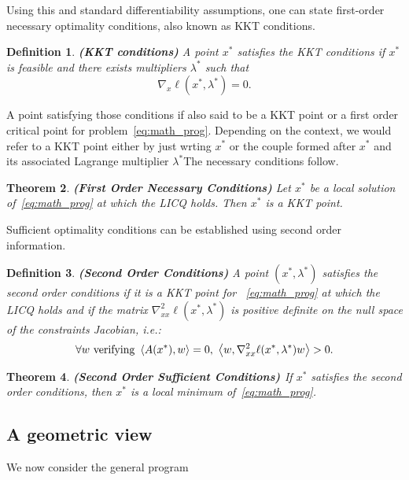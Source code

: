 \documentclass[10pt]{article}
\newtheorem{theorem}{Theorem}[]
\newtheorem{definition}[theorem]{Definition}
\numberwithin{equation}{section}
\begin{document}
	Using this and standard differentiability assumptions, one can state first-order necessary optimality conditions, also known as KKT conditions. 
	
	\begin{definition}\label{def:kkt_point}
		\textbf{(KKT conditions)}
		A point $x^*$ satisfies the KKT conditions if $x^* $ is feasible and there exists multipliers \(\lambda^*\) such that \[\nabla_x \ell (x^*,\lambda^*)=0.\]
	\end{definition}
	
	
	A point satisfying those conditions if also said to be a KKT point or a first order critical point for problem~\eqref{eq:math_prog}. Depending on the context, we would refer to a KKT point either by just wrting $x^*$ or the couple formed after $x^*$ and its associated Lagrange multiplier $\lambda^*$The necessary conditions follow.
	
	\begin{theorem}\label{theo:fonc}
		\textbf{(First Order Necessary Conditions)\cite[][Theorem 12.1]{nocedalwright:2006}}
		Let $x^*$ be a local solution of~\eqref{eq:math_prog} at which the LICQ holds. Then $x^*$ is a KKT point.
	\end{theorem}
	
	Sufficient optimality conditions can be established using second order information.
	
	\begin{definition}\label{def:soc}
		\textbf{(Second Order Conditions)}
		A point $(x^*,\lambda^*)$ satisfies the second order conditions if it is a KKT point for ~\eqref{eq:math_prog} at which the LICQ holds and if the matrix $\nabla_{xx}^2\ell(x^*,\lambda^*)$ is positive definite on the null space of the constraints Jacobian, i.e.:
		\[\forall w \text{ verifying } \left\langle {A(x^*)} , {w} \right\rangle=0,\ \left\langle {w} , {\nabla_{xx}^2\ell(x^*,\lambda^*)w} \right\rangle > 0.\]
	\end{definition}
	
	\begin{theorem} \textbf{(Second Order Sufficient Conditions) \cite[][Theorem 12.5]{nocedalwright:2006}}
		If $x^*$ satisfies the second order conditions, then $x^*$ is a local minimum of~\eqref{eq:math_prog}.
	\end{theorem}
	
	\subsection{A geometric view}
	
	We now consider the general program
	
\end{document}
